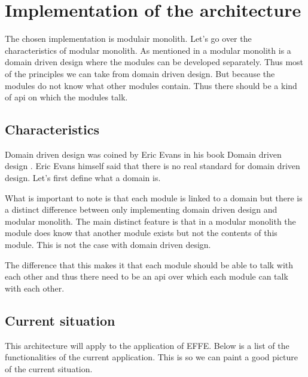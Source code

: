 \chapter{Implementation of the architecture}

The chosen implementation is modulair monolith. Let’s go over the characteristics of modular monolith. As mentioned in  a modular monolith is a domain driven design where the modules can be developed separately. Thus most of the principles we can take from domain driven design. But because the modules do not know what other modules contain. Thus there should be a kind of api on which the modules talk.

\section{Characteristics}

Domain driven design was coined by Eric Evans in his book Domain driven design \cite{domainDrivenDesign}. Eric Evans himself said that there is no real standard for domain driven design. Let’s first define what a domain is. 


What is important to note is that each module is linked to a domain but there is a distinct difference between only implementing domain driven design and modular monolith. The main distinct feature is that in a modular monolith the module does know that another module exists but not the contents of this module. This is not the case with domain driven design.

The difference that this makes it that each module should be able to talk with each other and thus there need to be an api over which each module can talk with each other. 

\section{Current situation}

This architecture will apply to the application of EFFE. Below is a list of the functionalities of the current application. This is so we can paint a good picture of the current situation.

